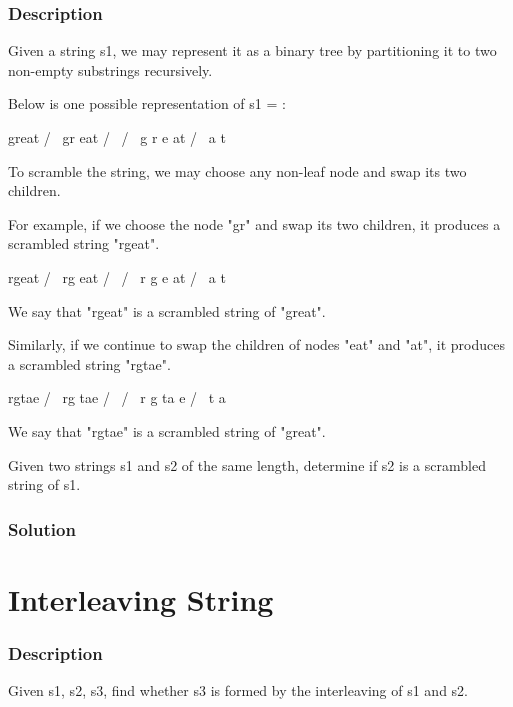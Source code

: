 \subsubsection{Description}
Given a string s1, we may represent it as a binary tree by partitioning it to two non-empty substrings recursively.

Below is one possible representation of s1 = :
\begin{Code}
    great
   /    \
  gr    eat
 / \    /  \
g   r  e   at
           / \
          a   t
\end{Code}
To scramble the string, we may choose any non-leaf node and swap its two children.

For example, if we choose the node "gr" and swap its two children, it produces a scrambled string "rgeat".
\begin{Code}
    rgeat
   /    \
  rg    eat
 / \    /  \
r   g  e   at
           / \
          a   t
\end{Code}
We say that "rgeat" is a scrambled string of "great".

Similarly, if we continue to swap the children of nodes "eat" and "at", it produces a scrambled string "rgtae".
\begin{Code}
    rgtae
   /    \
  rg    tae
 / \    /  \
r   g  ta  e
       / \
      t   a
\end{Code}
We say that "rgtae" is a scrambled string of "great".

Given two strings s1 and s2 of the same length, determine if s2 is a scrambled string of s1.
\subsubsection{Solution}

\begin{Code}

\end{Code}

\newpage

\section{Interleaving String} %

\subsubsection{Description}
Given s1, s2, s3, find whether s3 is formed by the interleaving of s1 and s2.

